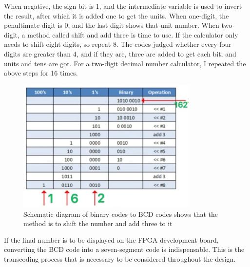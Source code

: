 \documentclass[11pt,journal,compsoc]{IEEEtran}
\begin{document}
When negative, the sign bit is 1, and the intermediate variable is used to invert the result, after which it is added one to get the units. When one-digit, the penultimate digit is 0, and the last digit shows that unit number. When two-digit, a method called shift and add three is time to use. If the calculator only needs to shift eight digits, so repeat 8. The codes judged whether every four digits are greater than 4, and if they are, three are added to get each bit, and units and tens are got. For a two-digit decimal number calculator, I repeated the above steps for 16 times.  
\begin{figure}[H]
	\centering
	\includegraphics[width=9cm]{fig5}
	\caption{Schematic diagram of binary codes to BCD codes shows that the method is to shift the number and add three to it}
	\label{Fig5}
\end{figure}
If the final number is to be displayed on the FPGA development board, converting the BCD code into a seven-segment code is indispensable. This is the transcoding process that is necessary to be considered throughout the design.
\end{document}

